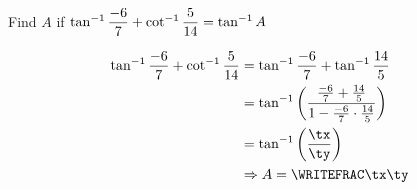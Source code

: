 



\FRACADD\vbone\vbtwo\vbfour\vbthree\tp\tq
\FRACMULT\vbone\vbtwo\vbfour\vbthree\tr\ts
{}\tr\ts\ta\tb
\FRACDIV\tp\tq\ta\tb\tx\ty

\question[1] Find $A$ if $\tan^{-1} \dfrac{-6}{7} + \cot^{-1}\dfrac{5}{14} = \tan^{-1} A$

\watchout

\ifprintanswers
\fi 

\begin{solution}[\halfpage]
	\begin{align}
	    \tan^{-1}\frac{\vbone}{\vbtwo} + \cot^{-1}\frac{\vbthree}{\vbfour} &= 
      \tan^{-1}\frac{\vbone}{\vbtwo} + \tan^{-1}\frac{\vbfour}{\vbthree} \\
	    &= \tan^{-1}\left(\dfrac{\frac{\vbone}{\vbtwo} + 
      \frac{\vbfour}{\vbthree}}{1-\frac{\vbone}{\vbtwo}\cdot\frac{\vbfour}{\vbthree}}\right) \\
	    &= \tan^{-1}\left(\dfrac\tx\ty\right) \\
      &\Rightarrow A = \WRITEFRAC\tx\ty 
	\end{align}
\end{solution}

